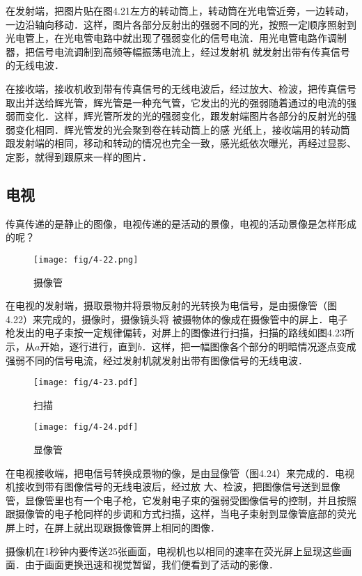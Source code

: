 在发射端，把图片贴在图4.21左方的转动筒上，转动筒在光电管近旁，一边转动，一边沿轴向移动．这样，图片各部分反射出的强弱不同的光，按照一定顺序照射到光电管上，在光电管电路中就出现了强弱变化的信号电流．用光电管电路作调制器，把信号电流调制到高频等幅振荡电流上，经过发射机
就发射出带有传真信号的无线电波．

在接收端，接收机收到带有传真信号的无线电波后，经过放大、检波，把传真信号取出并送给辉光管，辉光管是一种充气管，它发出的光的强弱随着通过的电流的强弱而变化．这样，辉光管所发的光的强弱变化，跟发射端图片各部分的反射光的强弱变化相同．辉光管发的光会聚到卷在转动筒上的感
光纸上，接收端用的转动筒跟发射端的相同，移动和转动的情况也完全一致，感光纸依次曝光，再经过显影、定影，就得到跟原来一样的图片．

\subsection{电视}

传真传递的是静止的图像，电视传递的是活动的景像，电视的活动景像是怎样形成的呢？
\begin{figure}[htp]\centering
	\texttt{[image: fig/4-22.png]}
	\caption{摄像管}
	\end{figure}

在电视的发射端，摄取景物并将景物反射的光转换为电信号，是由摄像管（图4.22）来完成的，摄像时，摄像镜头将
被摄物体的像成在摄像管中的屏上．电子枪发出的电子束按一定规律偏转，对屏上的图像进行扫描，扫描的路线如图4.23所示，从$a$开始，逐行进行，直到$b$．这样，把一幅图像各个部分的明暗情况逐点变成强弱不同的信号电流，经过发射机就发射出带有图像信号的无线电波．
\begin{figure}[htp]
	\centering
	\begin{minipage}[t]{0.48\textwidth}
	\centering
	\texttt{[image: fig/4-23.pdf]}
	\caption{扫描}
	\end{minipage}
	\begin{minipage}[t]{0.48\textwidth}
	\centering
	\texttt{[image: fig/4-24.pdf]}
	\caption{显像管}
	\end{minipage}
	\end{figure}
	
在电视接收端，把电信号转换成景物的像，是由显像管（图4.24）来完成的．电视机接收到带有图像信号的无线电波后，经过放
大、检波，把图像信号送到显像管，显像管里也有一个电子枪，它发射电子束的强弱受图像信号的控制，并且按照跟摄像管的电子枪同样的步调和方式扫描，这样，当电子束射到显像管底部的荧光屏上时，在屏上就出现跟摄像管屏上相同的图像．

摄像机在1秒钟内要传送25张画面，电视机也以相同的速率在荧光屏上显现这些画面．由于画面更换迅速和视觉暂留，我们便看到了活动的影像．

